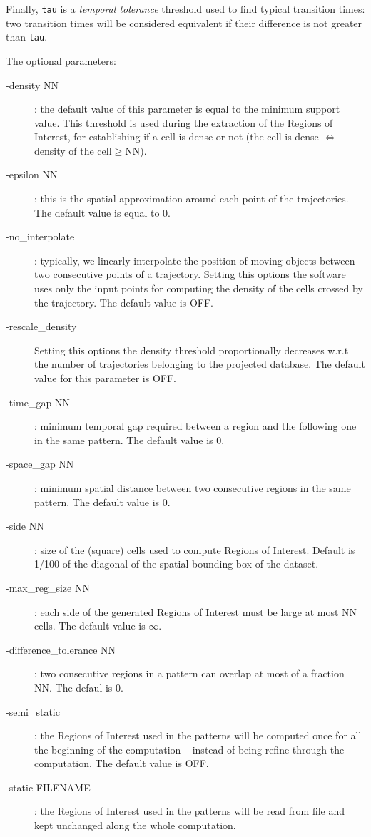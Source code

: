 \documentclass[12pt]{article}
\begin{document}
Finally, {\tt tau} is a {\em temporal tolerance} threshold used to find typical transition times: two transition times will be considered equivalent if their difference is not greater than {\tt tau}.

The optional parameters:
\begin{description}

\item[-density NN]: the default value of this parameter is equal to the minimum support value. This threshold is used during the extraction of the Regions of Interest, for establishing if a cell is dense or not (the cell is dense $\Leftrightarrow$ density of the cell$\geq$NN).
\item[-epsilon NN]: this is the spatial approximation around each point of the trajectories. The default value is equal to 0.
\item[-no\_interpolate]: typically, we linearly interpolate the position of moving objects between two consecutive points of a trajectory. Setting this options the software uses only the input points for computing the density of the cells crossed by the trajectory. The default value is OFF.
\item[-rescale\_density] Setting this options the density threshold proportionally decreases  w.r.t the number of trajectories belonging to the projected database. The default value for this parameter is OFF.
\item[-time\_gap NN]: minimum temporal gap required between a region and the following one in the same pattern. The default value is 0.
\item[-space\_gap NN]: minimum spatial distance between two consecutive regions in the same pattern. The default value is 0. 
\item[-side NN]: size of the (square) cells used to compute Regions of Interest. Default is 1/100 of the diagonal of the spatial bounding box of the dataset.
\item[-max\_reg\_size NN]: each side of the generated Regions of Interest must be large at most NN cells. The default value is $\infty$.
\item[-difference\_tolerance NN]: two consecutive regions in a pattern can overlap at most of a fraction NN. The defaul is 0.
\item[-semi\_static]: the Regions of Interest used in the patterns will be computed once for all the beginning of the computation -- instead of being refine through the computation. The default value is OFF.
\item[-static FILENAME]: the Regions of Interest used in the patterns will be read from file and kept unchanged along the whole computation.
 
\end{description}
\end{document}
